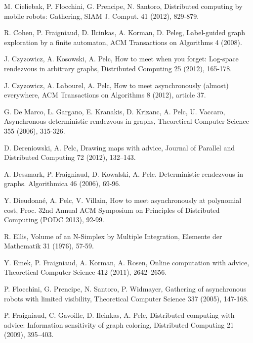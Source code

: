\documentclass{llncs}
\begin{document}
\begin{thebibliography}{12}
M. Cieliebak, P. Flocchini, G. Prencipe, N. Santoro, 
Distributed computing by mobile robots: Gathering, SIAM J. Comput. 41 (2012), 829-879.

R. Cohen, P. Fraigniaud, D. Ilcinkas, A. Korman, D. Peleg, 
Label-guided graph exploration by a finite automaton, 
ACM Transactions on Algorithms 4 (2008).



J. Czyzowicz, A. Kosowski, A. Pelc, How to meet when you forget: Log-space rendezvous in arbitrary graphs, Distributed Computing 25 (2012), 165-178. 

J. Czyzowicz, A. Labourel, A. Pelc, How to meet asynchronously (almost) everywhere, 
ACM Transactions on Algorithms 8 (2012), article 37. 





G. De Marco, L. Gargano, E. Kranakis, D. Krizanc, A. Pelc, U. Vaccaro, 
Asynchronous deterministic rendezvous in graphs, 
Theoretical Computer Science 355 (2006), 315-326.

D. Dereniowski, A. Pelc, Drawing maps with advice,  Journal of Parallel and Distributed Computing 72 (2012), 132--143. 



A. Dessmark, P. Fraigniaud, D. Kowalski, A. Pelc.
Deterministic rendezvous in graphs.
Algorithmica 46 (2006), 69-96.


Y. Dieudonn\'{e}, A. Pelc, V. Villain, How to meet asynchronously at polynomial cost, Proc. 32nd Annual ACM Symposium on Principles of Distributed Computing (PODC 2013), 92-99.

R. Ellis,
Volume of an N-Simplex by Multiple Integration, 
Elemente der Mathematik 31 (1976), 57-59.

Y. Emek, P. Fraigniaud, A. Korman, A. Rosen, Online computation with advice, Theoretical Computer Science 412 (2011), 2642--2656.




P. Flocchini, G. Prencipe, N. Santoro, P. Widmayer,
Gathering of asynchronous robots with limited visibility, Theoretical Computer Science 337 (2005), 147-168.




P. Fraigniaud, C. Gavoille, D. Ilcinkas, A. Pelc, 
Distributed computing with advice: Information sensitivity of graph coloring, 
Distributed Computing 21 (2009), 395--403.


\end{thebibliography}
\end{document}
